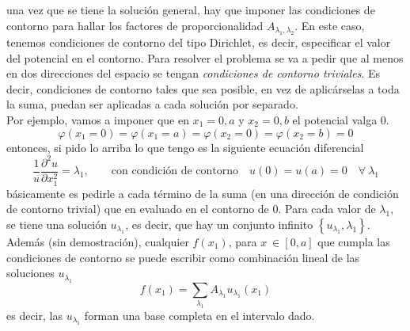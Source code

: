 una vez que se tiene la solución general, hay que imponer las condiciones de contorno para hallar los factores de proporcionalidad $A_{\lambda_{1},\lambda_{2}}$. En este caso, tenemos condiciones de contorno del tipo Dirichlet, es decir, especificar el valor del potencial en el contorno. Para resolver el problema se va a pedir que al menos en dos direcciones del espacio se tengan \textit{condiciones de contorno triviales}. Es decir, condiciones de contorno tales que sea posible, en vez de aplicárselas a toda la suma, puedan ser aplicadas a cada solución por separado.\\
\indent Por ejemplo, vamos a imponer que en $x_{1} = 0, a$ y $x_{2} = 0, b$ el potencial valga 0.
\begin{equation*}
    \varphi(x_{1} = 0) = 
    \varphi(x_{1} = a) =
    \varphi(x_{2} = 0) =
    \varphi(x_{2} = b) = 0
\end{equation*}
entonces, si pido lo arriba lo que tengo es la siguiente ecuación diferencial
\begin{equation*}
    \frac{1}{u}\frac{\partial^{2}u}{\partial x_{1}^{2}} = \lambda_{1},
    \quad
    \quad
    \mbox{con condición de contorno}
    \quad
    u(0) = u(a) = 0
    \quad 
    \forall\ \lambda_{1}
\end{equation*}
básicamente es pedirle a cada término de la suma (en una dirección de condición de contorno trivial) que en evaluado en el contorno de 0. Para cada valor de $\lambda_{1}$, se tiene una solución $u_{\lambda_{1}}$, es decir, que hay un conjunto infinito $\left\{ u_{\lambda_{1}}, \lambda_{1}\right\}$.\\
\indent Además (sin demostración), cualquier $f(x_{1})$, para $x\ \in [0,a]$ que cumpla las condiciones de contorno se puede escribir como combinación lineal de las soluciones $u_{\lambda_{1}}$
\begin{equation*}
    f(x_{1}) = \sum\limits_{\lambda_{1}}A_{\lambda_{1}}u_{\lambda_{1}}(x_{1})
\end{equation*}
es decir, las $u_{\lambda_{1}}$ forman una base completa en el intervalo dado.




